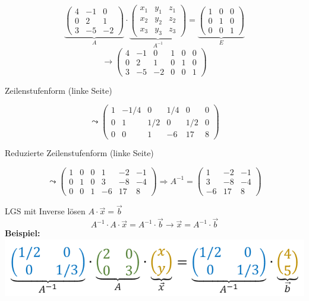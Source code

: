 \begin{example}
    $$
\underbrace{\left(\begin{array}{ccc}
4 & -1 & 0 \\
0 & 2 & 1 \\
3 & -5 & -2
\end{array}\right)}_{A} \cdot \underbrace{\left(\begin{array}{lll}
x_{1} & y_{1} & z_{1} \\
x_{2} & y_{2} & z_{2} \\
x_{3} & y_{3} & z_{3}
\end{array}\right)}_{A^{-1}}=\underbrace{\left(\begin{array}{lll}
1 & 0 & 0 \\
0 & 1 & 0 \\
0 & 0 & 1
\end{array}\right)}_{E}$$
$$ \rightarrow\left(\begin{array}{ccc|ccc}
4 & -1 & 0 & 1 & 0 & 0 \\
0 & 2 & 1 & 0 & 1 & 0 \\
3 & -5 & -2 & 0 & 0 & 1
\end{array}\right)
$$

Zeilenstufenform (linke Seite)

$$ \leadsto 
\left(\begin{array}{ccc|ccc}
1 & -1 / 4 & 0 & 1 / 4 & 0 & 0 \\
0 & 1 & 1 / 2 & 0 & 1 / 2 & 0 \\
0 & 0 & 1 & -6 & 17 & 8
\end{array}\right)
$$

Reduzierte Zeilenstufenform (linke Seite)

$$ \leadsto 
\left(\begin{array}{ccc|ccc}
1 & 0 & 0 & 1 & -2 & -1 \\
0 & 1 & 0 & 3 & -8 & -4 \\
0 & 0 & 1 & -6 & 17 & 8
\end{array}\right) \Rightarrow A^{-1}=\left(\begin{array}{ccc}
1 & -2 & -1 \\
3 & -8 & -4 \\
-6 & 17 & 8
\end{array}\right)
$$
\end{example}



\begin{concept}{LGS mit Inverse lösen}
    $A \cdot \vec{x} = \vec{b}$
    $$A^{-1} \cdot A \cdot \vec{x} = A^{-1} \cdot \vec{b} \rightarrow \vec{x} = A^{-1} \cdot \vec{b}$$
    \textbf{Beispiel:}\\
    \includegraphics[width=0.5\linewidth]{lgs_inverse.png}
\end{concept}



